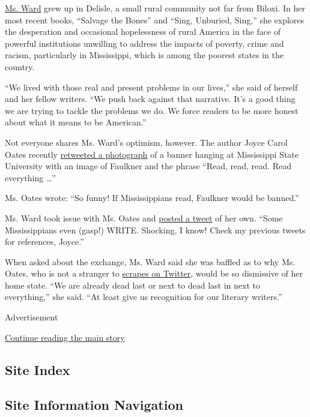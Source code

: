 \href{https://www.nytimes3xbfgragh.onion/2017/08/31/books/review/jesmyn-ward-by-the-book.html}{Ms.
Ward} grew up in Delisle, a small rural community not far from Biloxi.
In her most recent books, ``Salvage the Bones'' and ``Sing, Unburied,
Sing,'' she explores the desperation and occasional hopelessness of
rural America in the face of powerful institutions unwilling to address
the impacts of poverty, crime and racism, particularly in Mississippi,
which is among the poorest states in the country.

``We lived with those real and present problems in our lives,'' she said
of herself and her fellow writers. ``We push back against that
narrative. It's a good thing we are trying to tackle the problems we do.
We force readers to be more honest about what it means to be American.''

Not everyone shares Ms. Ward's optimism, however. The author Joyce Carol
Oates recently
\href{https://twitter.com/joycecaroloates/status/920638826971877379?lang=en}{retweeted
a photograph} of a banner hanging at Mississippi State University with
an image of Faulkner and the phrase ``Read, read, read. Read everything
\ldots{}''

Ms. Oates wrote: ``So funny! If Mississippians read, Faulkner would be
banned.''

Ms. Ward took issue with Ms. Oates and
\href{https://twitter.com/jesmimi/status/921112146565586944?lang=en}{posted
a tweet} of her own. ``Some Mississippians even (gasp!) WRITE. Shocking,
I know! Check my previous tweets for references, Joyce.''

When asked about the exchange, Ms. Ward said she was baffled as to why
Ms. Oates, who is not a stranger to
\href{https://www.nytimes3xbfgragh.onion/2015/11/24/books/joyce-carol-oates-celebratory-joyous-islamic-state-twitter.html}{scrapes
on Twitter}, would be so dismissive of her home state. ``We are already
dead last or next to dead last in next to everything,'' she said. ``At
least give us recognition for our literary writers.''

Advertisement

\protect\hyperlink{after-bottom}{Continue reading the main story}

\hypertarget{site-index}{%
\subsection{Site Index}\label{site-index}}

\hypertarget{site-information-navigation}{%
\subsection{Site Information
Navigation}\label{site-information-navigation}}

